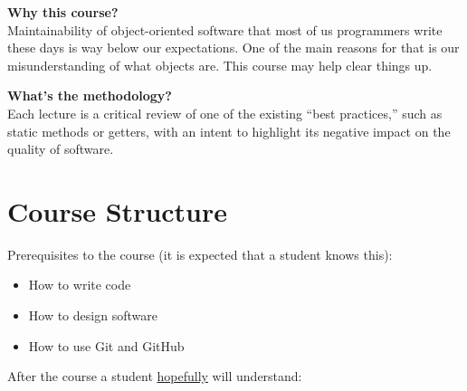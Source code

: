 \documentclass[nobrand,anonymous,nodate,nosecurity]{huawei}
\begin{document}
\textbf{Why this course?}\\
Maintainability of object-oriented software that most of us programmers write these days is
way below our expectations. One of the main reasons for that is our misunderstanding
of what objects are. This course may help clear things up.

\textbf{What's the methodology?}\\
Each lecture is a critical review of one of the existing ``best practices,'' such as
static methods or getters, with an intent to highlight its negative impact
on the quality of software.

\newpage
\section*{Course Structure}

Prerequisites to the course (it is expected that a student knows this):

\begin{itemize}
\item How to write code
\item How to design software
\item How to use Git and GitHub
\end{itemize}

After the course a student \ul{hopefully} will understand:
\end{document}
